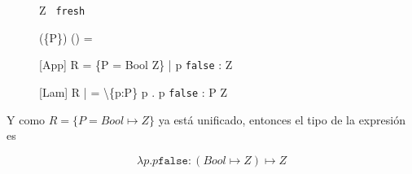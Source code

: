 \documentclass{article}
\begin{document}
\begin{enumerate}
{\begin{enumerate}
{\begin{figure}[H]
\begin{prooftree}
							 {Z \texttt{ fresh}}

							 {
								(\varnothing \cup \{P\})
								\cap
								(\varnothing \cup \varnothing)
								= \varnothing
							}

							 [App] {
								R = \{P = Bool \mapsto Z\} | \Gamma 
								\vdash p \texttt{false} : Z
							}

							 [Lam] {
								R | \varnothing = \Gamma \backslash \{p:P\}
								\vdash \lambda p . p \texttt{false} : P \mapsto Z
							}
						\end{prooftree}
						\label{C}
					\end{figure}

					Y como $R = \{P = Bool \mapsto Z\}$ ya está unificado, 
					entonces el tipo de la expresión es

					\[
						\lambda p. p \texttt{false} : (Bool \mapsto Z) \mapsto Z
					\]

				}
			\end{enumerate}
        }
    \end{enumerate}
\end{document}
